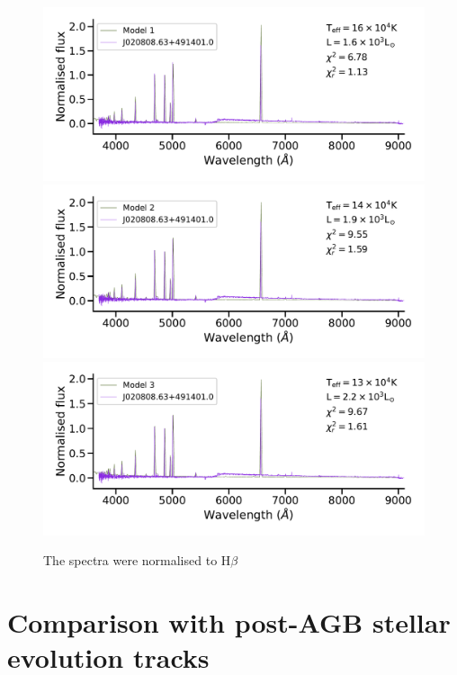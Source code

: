 \documentclass[fleqn,usenatbib]{mnras}
\begin{document}
{\begin{figure}
\centering
\includegraphics[width=0.89\linewidth, trim=10 90 10 10, clip]{Figs/model_160000_36.79.pdf}
\includegraphics[width=0.89\linewidth, trim=10 90 10 10, clip]{Figs/model_140000_36.86.pdf}
\includegraphics[width=0.89\linewidth, trim=10 10 10 10, clip]{Figs/model_130000_36.93.pdf}
  \caption{The spectra were normalised to H{$\beta$}} 
  \label{fig:spectra-obs-model}
\end{figure}

\section{Comparison with post-AGB stellar evolution tracks}
\label{sec:tracks}

}
\end{document}
